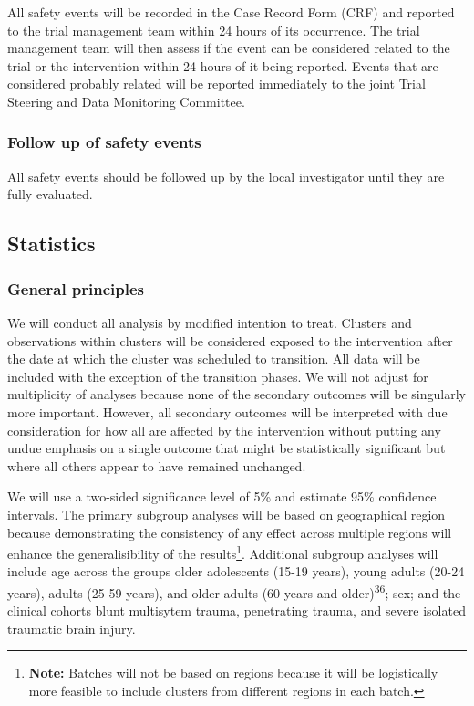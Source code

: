 \documentclass[
]{scrartcl}
\begin{document}
All safety events will be recorded in the Case Record Form (CRF) and
reported to the trial management team within 24 hours of its occurrence.
The trial management team will then assess if the event can be
considered related to the trial or the intervention within 24 hours of
it being reported. Events that are considered probably related will be
reported immediately to the joint Trial Steering and Data Monitoring
Committee.

\hypertarget{follow-up-of-safety-events}{%
\subsubsection{Follow up of safety
events}\label{follow-up-of-safety-events}}

All safety events should be followed up by the local investigator until
they are fully evaluated.

\hypertarget{statistics}{%
\subsection{Statistics}\label{statistics}}

\hypertarget{general-principles}{%
\subsubsection{General principles}\label{general-principles}}

We will conduct all analysis by modified intention to treat. Clusters
and observations within clusters will be considered exposed to the
intervention after the date at which the cluster was scheduled to
transition. All data will be included with the exception of the
transition phases. We will not adjust for multiplicity of analyses
because none of the secondary outcomes will be singularly more
important. However, all secondary outcomes will be interpreted with due
consideration for how all are affected by the intervention without
putting any undue emphasis on a single outcome that might be
statistically significant but where all others appear to have remained
unchanged.

We will use a two-sided significance level of 5\% and estimate 95\%
confidence intervals. The primary subgroup analyses will be based on
geographical region because demonstrating the consistency of any effect
across multiple regions will enhance the generalisibility of the
results\footnote{\textbf{Note:} Batches will not be based on regions
  because it will be logistically more feasible to include clusters from
  different regions in each batch.}. Additional subgroup analyses will
include age across the groups older adolescents (15-19 years), young
adults (20-24 years), adults (25-59 years), and older adults (60 years
and older)\textsuperscript{36}; sex; and the clinical cohorts blunt
multisytem trauma, penetrating trauma, and severe isolated traumatic
brain injury.
\end{document}
